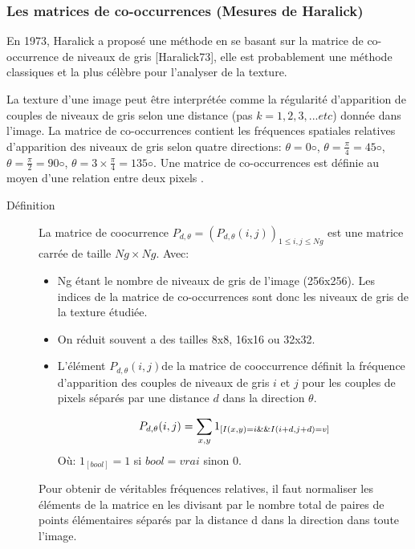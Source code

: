 \subsubsection{Les matrices de co-occurrences (Mesures de Haralick)}
 En 1973, Haralick a proposé une méthode en se basant sur la matrice de co-occurrence de niveaux de gris [Haralick73], elle est probablement une méthode classiques et la plus célèbre pour l'analyser de la texture.
 
 La texture d'une image peut être interprétée comme la régularité d'apparition de couples de niveaux de gris selon une distance (pas $k=1, 2, 3, ...etc$) donnée dans l’image. La matrice de co-occurrences contient les fréquences spatiales relatives d’apparition des niveaux
 de gris selon quatre directions: $\theta = 0◦$,  $\theta =  \frac{\pi}{4} = 45◦$,  $\theta =  \frac{\pi}{2} = 90◦$,  $\theta =  3 \times \frac{\pi}{4} = 135◦$. Une matrice de co-occurrences est définie au moyen d’une relation entre deux pixels .\\

\begin{description}
	\item[Définition] La matrice de coocurrence $P_{d,\theta}=(P_{d,\theta}(i, j))_{1\leq i,j \leq Ng}$ est une matrice carrée de taille $Ng \times Ng$. Avec:
	\begin{itemize}
		\item Ng étant le nombre de niveaux de gris de l'image (256x256). Les indices de la matrice de co-occurrences sont
		donc les niveaux de gris de la texture étudiée.
		\item On réduit souvent a des tailles 8x8, 16x16 ou 32x32.
		\item L’élément $P_{d,\theta}(i, j)$de la matrice de cooccurrence définit la fréquence d'apparition des couples de niveaux de gris $i$ et $j$ pour les couples de pixels séparés par une distance $d$ dans la direction $\theta$.
		
		\begin{equation}
			P_{d,\theta}(i, j) = \sum_{x,y} 1_{ [I(x, y) = i \space \&\& \space  I(i + d, j + d) = v ]}
		\end{equation}
		Où: $ 1_{ [bool]} = 1 $ si $ bool = vrai $ sinon 0.
	\end{itemize} 
Pour obtenir de véritables fréquences relatives, il faut normaliser les éléments de la matrice en les divisant par le nombre total de paires de points élémentaires séparés par la distance d dans la direction dans toute l’image.
\end{description}

